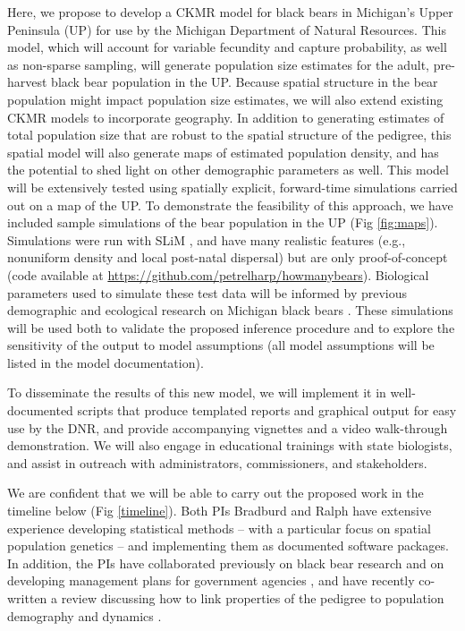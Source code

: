 \documentclass[11pt]{article}
\begin{document}
Here, we propose to develop a CKMR model 
for black bears in Michigan's Upper Peninsula (UP) 
for use by the Michigan Department of Natural Resources.
This model, which will account for 
variable fecundity and capture probability, 
as well as non-sparse sampling, 
will generate population size estimates 
for the adult, pre-harvest black bear population in the UP. 
Because spatial structure in the bear population might impact 
population size estimates, 
we will also extend existing CKMR models 
to incorporate geography.
In addition to generating estimates of total population size 
that are robust to the spatial structure of the pedigree, 
this spatial model will also generate maps of estimated 
population density, 
and has the potential to shed light 
on other demographic parameters as well.
This model will be extensively tested using spatially explicit,  
forward-time simulations carried out on a map of the UP. 
To demonstrate the feasibility of this approach, 
we have included sample simulations 
of the bear population in the UP (Fig \ref{fig:maps}).
Simulations were run with SLiM \citep{haller2018forward},
and have many realistic features 
(e.g., nonuniform density and local post-natal dispersal) 
but are only proof-of-concept 
(code available at \url{https://github.com/petrelharp/howmanybears}).
Biological parameters used to simulate these test data 
will be informed by previous demographic and ecological 
research on Michigan black bears \citep{moore2014application}.
These simulations will be used both to 
validate the proposed inference procedure 
and to explore the sensitivity of the output to model assumptions 
(all model assumptions will be listed in the model documentation).

To disseminate the results of this new model, 
we will implement it in well-documented scripts 
that produce templated reports and graphical output
for easy use by the DNR, 
and provide accompanying vignettes 
and a video walk-through demonstration. 
We will also engage in educational trainings with state biologists, 
and assist in outreach with 
administrators, commissioners, and stakeholders.

We are confident that we will be able to 
carry out the proposed work in the timeline below (Fig \ref{timeline}).
Both PIs Bradburd and Ralph have extensive 
experience developing statistical methods \citep{bedassle, SpaceMix, bradburd2018inferring} -- 
with a particular focus on spatial population genetics \citep{bradburd2019spatial, Battey_etal_2020} -- 
and implementing them as documented software packages.
In addition, the PIs have collaborated previously 
on black bear research \citep{bradburd2018inferring}
and on developing management plans 
for government agencies \citep{shaffer2017desert}, 
and have recently co-written a review discussing how to link properties of the pedigree
to population demography and dynamics \citep{bradburd2019spatial}.
\end{document}
